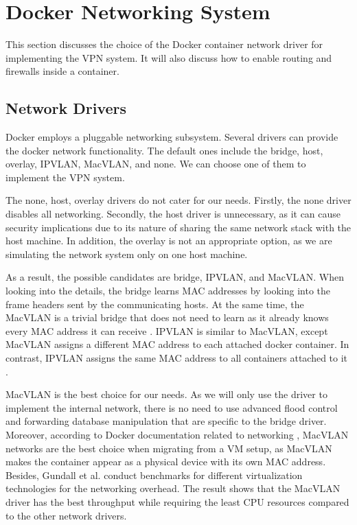 \documentclass[article]{aaltoseries}
\begin{document}


\section{Docker Networking System}
This section discusses the choice of the Docker container network driver for implementing the VPN system. It will also discuss how to enable routing and firewalls inside a container.

\subsection{Network Drivers}
Docker employs a pluggable networking subsystem. Several drivers can provide the docker network functionality. The default ones include the bridge, host, overlay, IPVLAN, MacVLAN, and none. We can choose one of them to implement the VPN system.

The none, host, overlay drivers do not cater for our needs. Firstly, the none driver disables all networking. Secondly, the host driver is unnecessary, as it can cause security implications due to its nature of sharing the same network stack with the host machine. In addition, the overlay is not an appropriate option, as we are simulating the network system only on one host machine.

As a result, the possible candidates are bridge, IPVLAN, and MacVLAN. When looking into the details, the bridge learns MAC addresses by looking into the frame headers sent by the communicating hosts. At the same time, the MacVLAN is a trivial bridge that does not need to learn as it already knows every MAC address it can receive \cite{9620212}. IPVLAN is similar to MacVLAN, except MacVLAN assigns a different MAC address to each attached docker container. In contrast, IPVLAN assigns the same MAC address to all containers attached to it \cite{7502883}.

MacVLAN is the best choice for our needs. As we will only use the driver to implement the internal network, there is no need to use advanced flood control and forwarding database manipulation that are specific to the bridge driver. Moreover, according to Docker documentation related to networking \cite{docker_documentation_2023}, MacVLAN networks are the best choice when migrating from a VM setup, as MacVLAN makes the container appear as a physical device with its own MAC address. Besides, Gundall et al. \cite{9442123} conduct benchmarks for different virtualization technologies for the networking overhead. The result shows that the MacVLAN driver has the best throughput while requiring the least CPU resources compared to the other network drivers.
\end{document}
